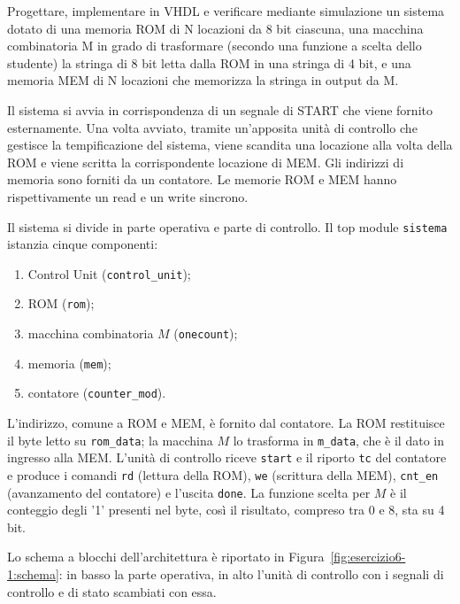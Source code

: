 \label{sec:esercizio6-1}

\begin{traccia}
Progettare, implementare in VHDL e verificare mediante simulazione un sistema dotato di una memoria ROM di N locazioni da 8 bit ciascuna, una macchina combinatoria M in grado di trasformare (secondo una funzione a scelta dello studente) la stringa di 8 bit letta dalla ROM in una stringa di 4 bit, e una memoria MEM di N locazioni che memorizza la stringa in output da M.

Il sistema si avvia in corrispondenza di un segnale di START che viene fornito esternamente. Una volta avviato, tramite un'apposita unità di controllo che gestisce la tempificazione del sistema, viene scandita una locazione alla volta della ROM e viene scritta la corrispondente locazione di MEM. Gli indirizzi di memoria sono forniti da un contatore. Le memorie ROM e MEM hanno rispettivamente un read e un write sincrono.
\end{traccia}


\progetto

Il sistema si divide in parte operativa e parte di controllo. Il top module \texttt{sistema} istanzia cinque componenti:
\begin{enumerate}
  \item Control Unit (\texttt{control\_unit});
  \item ROM (\texttt{rom});
  \item macchina combinatoria $M$ (\texttt{onecount});
  \item memoria (\texttt{mem});
  \item contatore (\texttt{counter\_mod}).
\end{enumerate}

L'indirizzo, comune a ROM e MEM, è fornito dal contatore. La ROM restituisce il byte letto su \texttt{rom\_data}; la macchina $M$ lo trasforma in \texttt{m\_data}, che è il dato in ingresso alla MEM. L'unità di controllo riceve \texttt{start} e il riporto \texttt{tc} del contatore e produce i comandi \texttt{rd} (lettura della ROM), \texttt{we} (scrittura della MEM), \texttt{cnt\_en} (avanzamento del contatore) e l'uscita \texttt{done}. La funzione scelta per $M$ è il conteggio degli '1' presenti nel byte, così il risultato, compreso tra 0 e 8, sta su 4 bit.

Lo schema a blocchi dell'architettura è riportato in Figura~\ref{fig:esercizio6-1:schema}: in basso la parte operativa, in alto l'unità di controllo con i segnali di controllo e di stato scambiati con essa.

